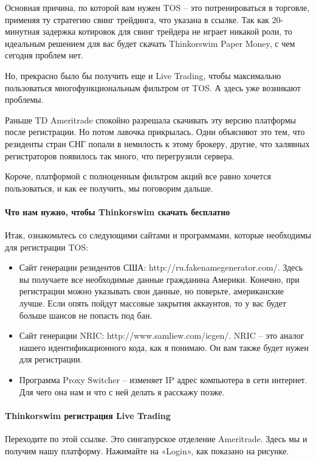 \documentclass[a5paper]{article}
\begin{document}
Основная причина, по которой вам нужен TOS – это потренироваться в торговле, применяя ту стратегию свинг трейдинга, что указана в ссылке. Так как 20-минутная задержка котировок для свинг трейдера не играет никакой роли, то идеальным решением для вас будет скачать Thinkorswim Paper Money, с чем сегодня проблем нет.

Но, прекрасно было бы получить еще и Live Trading, чтобы максимально пользоваться многофункциональным фильтром от TOS. А здесь уже возникают проблемы.

Раньше TD Ameritrade спокойно разрешала скачивать эту версию платформы после регистрации. Но потом лавочка прикрылась. Одни объясняют это тем, что резиденты стран СНГ попали в немилость к этому брокеру, другие, что халявных регистраторов появилось так много, что перегрузили сервера.

Короче, платформой с полноценным фильтром акций все равно хочется
пользоваться, и как ее получить, мы поговорим дальше.

\paragraph{Что нам нужно, чтобы Thinkorswim скачать бесплатно}

Итак, ознакомьтесь со следующими сайтами и программами, которые необходимы для регистрации TOS:
\begin{itemize}
\item     Сайт генерации резидентов США: http://ru.fakenamegenerator.com/. Здесь вы получаете все необходимые данные гражданина Америки. Конечно, при регистрации можно указывать свои данные, но поверьте, американские лучше. Если опять пойдут массовые закрытия аккаунтов, то у вас будет больше шансов не попасть под бан.
\item     Сайт генерации NRIC: http://www.samliew.com/icgen/. NRIC – это аналог нашего идентификационного кода, как я понимаю. Он вам также будет нужен для регистрации.
\item     Программа Proxy Switcher – изменяет IP адрес компьютера в сети
    интернет. Для чего она нам и что с ней делать я расскажу позже.
  \end{itemize}

\paragraph{Thinkorswim регистрация Live Trading}

Переходите по этой ссылке. Это сингапурское отделение
Ameritrade. Здесь мы и получим нашу платформу. Нажимайте на «Login»,
как показано на рисунке.
\end{document}
